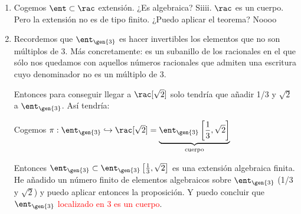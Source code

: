 \begin{example}
	\begin{enumerate}
		\item Cogemos $\ent \subset \rac$ extensión. ¿Es algebraica? Siiii. $\rac$ es un cuerpo. Pero la extensión no es de tipo finito. ¿Puedo aplicar el teorema?  Noooo
		\item 
		Recordemos que $\ent_{\gen{3}}$ es hacer invertibles los elementos que no son múltiplos de 3. Más concretamente: es un subanillo de los racionales en el que sólo nos quedamos con aquellos números racionales que admiten una escritura cuyo denominador no es un múltiplo de 3.
		
		Entonces para conseguir llegar a $\rac[\sqrt{2}]$ solo tendría que añadir 1/3 y $\sqrt{2}$ a $\ent_{\gen{3}}$. Así tendría:
		
		Cogemos $\pi: \ent_{\gen{3}} \hookrightarrow \rac[\sqrt{2}]=
		\underbrace{\ent_{\gen{3}}\left[\frac{1}{3}, \sqrt{2}\right]}_{\text{cuerpo}}$

		Entonces $\ent_{\gen{3}} \subset	 \ent_{\gen{3}}\left[\frac{1}{3},\sqrt{2}\right]$ es una extensión algebraica finita. He añadido un número finito de elementos algebraicos sobre $\ent_{\gen{3}}$ (1/3 y $\sqrt{2}$) y puedo aplicar entonces la proposición. Y puedo concluir que \textcolor{red}{$\ent_{\gen{3}}$ localizado en 3 es un cuerpo}.	
	\end{enumerate}
\end{example}

